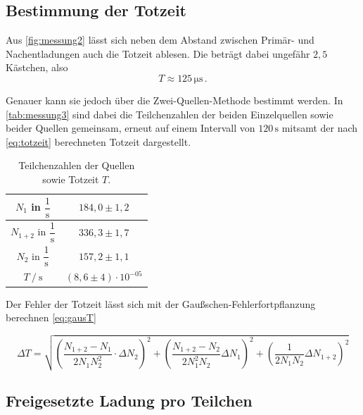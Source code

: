 \subsection{Bestimmung der Totzeit}

Aus \autoref{fig:messung2} lässt sich neben dem Abstand zwischen Primär- und Nachentladungen auch die Totzeit ablesen.
Die beträgt dabei ungefähr $2,5$ Kästchen, also
\begin{equation*}
    T \approx 125 \,\unit{\micro\second} \,.
\end{equation*}

Genauer kann sie jedoch über die Zwei-Quellen-Methode bestimmt werden.
In \autoref{tab:messung3} sind dabei die Teilchenzahlen der beiden Einzelquellen sowie beider Quellen gemeinsam, erneut auf einem Intervall von $120 \,\unit{\second}$ mitsamt der nach \eqref{eq:totzeit} berechneten Totzeit dargestellt.

\begin{table}[H]
    \centering
    \caption{Teilchenzahlen der Quellen sowie Totzeit $T$.}
    \label{tab:messung3}
    \begin{tabular}{|S | S|}
      \hline
        {$N_1$ in $\dfrac{1}{\unit{\second}}$}                             &  {$184,0 \pm 1,2$}  \\
        \hline
        {$N_{1 + 2}$ in $\dfrac{1}{\unit{\second}}$}                      &  {$336,3 \pm 1,7$}    \\
        \hline
        {$N_2$ in $\dfrac{1}{\unit{\second}}$}                             &  {$157,2 \pm 1,1$}    \\
        \hline
        {$T \mathbin{/} \unit{\second}$}    &  {$(8,6 \pm 4) \cdot 10^{-05}$} \\
    \hline
    \end{tabular}
\end{table}
Der Fehler der Totzeit lässt sich mit der Gaußschen-Fehlerfortpflanzung berechnen \eqref{eq:gausT}

\begin{equation}
    \Delta T  = \sqrt{  \left( \frac{N_{1+2}-N_1}{2 N_1 N_2^2} \cdot \Delta N_2 \right)^2 + \left( \frac{N_{1+2} - N_2}{2N_1^2 N_2} \Delta N_1 \right)^2 + \left(  \frac{1}{2 N_1 N_2} \Delta N_{1+2}    \right)^2                     }
  \label{eq:gausT}
\end{equation}

\subsection{Freigesetzte Ladung pro Teilchen}
\label{subsec:ladung}


